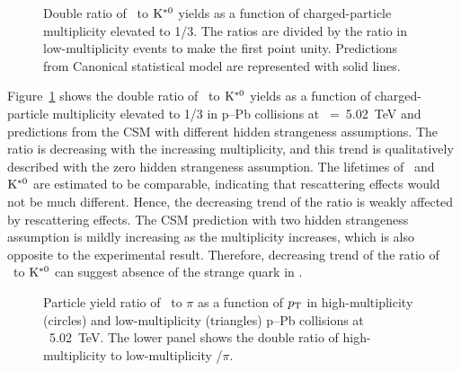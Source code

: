 \begin{figure}[!hbt]
	\centering
	\caption{ Double ratio of \fzero~to $\rm{}K^{*0}$ yields as a function of charged-particle multiplicity elevated to 1/3. The ratios are divided by the ratio in low-multiplicity events to make the first point unity. Predictions from Canonical statistical model are represented with solid lines. }
	\label{fig:f0KSAddCSM}
\end{figure}

Figure~\ref{fig:f0KSAddCSM} shows the double ratio of \fzero~to $\rm{}K^{*0}$ yields as a function of charged-particle multiplicity elevated to 1/3 in p--Pb collisions at \snn~=~5.02~TeV and predictions from the CSM with different hidden strangeness assumptions. The ratio is decreasing with the increasing multiplicity, and this trend is qualitatively described with the zero hidden strangeness assumption. The lifetimes of \fzero~and $\rm{}K^{*0}$ are estimated to be comparable, indicating that rescattering effects would not be much different. Hence, the decreasing trend of the ratio is weakly affected by rescattering effects. The CSM prediction with two hidden strangeness assumption is mildly increasing as the multiplicity increases, which is also opposite to the experimental result. Therefore, decreasing trend of the ratio of \fzero~to $\rm{}K^{*0}$ can suggest absence of the strange quark in \fzero.

\begin{figure}[!hbt]
	\centering
	\caption{ Particle yield ratio of \fzero~to $\pi$ as a function of $p_{\rm{T}}$ in high-multiplicity (circles) and low-multiplicity (triangles) p--Pb collisions at \snn~5.02~TeV. The lower panel shows the double ratio of high-multiplicity to low-multiplicity \fzero/$\pi$. }
	\label{fig:f0piPt}
\end{figure}

